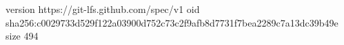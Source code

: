 version https://git-lfs.github.com/spec/v1
oid sha256:c0029733d529f122a03900d752c73c2f9afb8d7731f7bea2289c7a13dc39b49e
size 494
